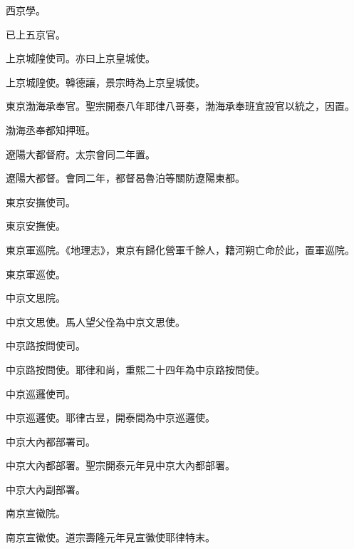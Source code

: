 \begin{pinyinscope}
 西京學。



 已上五京官。



 上京城隍使司。亦曰上京皇城使。



 上京城隍使。韓德讓，景宗時為上京皇城使。



 東京渤海承奉官。聖宗開泰八年耶律八哥奏，渤海承奉班宜設官以統之，因置。



 渤海丞奉都知押班。



 遼陽大都督府。太宗會同二年置。



 遼陽大都督。會同二年，都督曷魯泊等關防遼陽東都。



 東京安撫使司。



 東京安撫使。



 東京軍巡院。《地理志》，東京有歸化營軍千餘人，籍河朔亡命於此，置軍巡院。



 東京軍巡使。



 中京文思院。



 中京文思使。馬人望父佺為中京文思使。



 中京路按問使司。



 中京路按問使。耶律和尚，重熙二十四年為中京路按問使。



 中京巡邏使司。



 中京巡邏使。耶律古昱，開泰間為中京巡邏使。



 中京大內都部署司。



 中京大內都部署。聖宗開泰元年見中京大內都部署。



 中京大內副部署。



 南京宣徽院。



 南京宣徽使。道宗壽隆元年見宣徽使耶律特末。




\end{pinyinscope}

